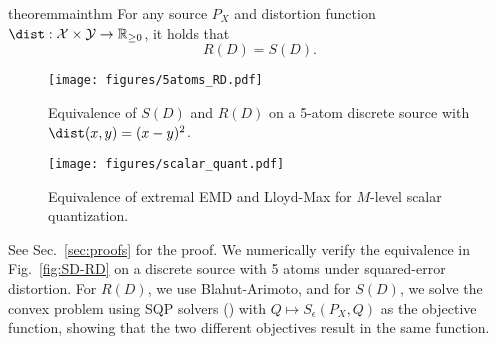 \documentclass{article} %
\begin{document}
	

        \begin{restatable}{theorem}{mainthm}%
            For any source $P_X$ and distortion function $\dist: \mathcal{X} \times \mathcal{Y} \rightarrow \mathbb{R}_{\geq 0}$, it holds that
            \begin{equation}
                R(D) = S(D).
            \end{equation}
        \end{restatable}

        

        \begin{figure*}[t]
            \centering
            \begin{minipage}{.48\textwidth}
                \centering
                \texttt{[image: figures/5atoms\_RD.pdf]}
                \caption{Equivalence of $S(D)$ and $R(D)$ on a 5-atom discrete source with $\dist(x,y)=(x-y)^2$. }
                \label{fig:SD-RD}
            \end{minipage}%
            \hfill
            \begin{minipage}{0.48\textwidth}
                \centering
                \texttt{[image: figures/scalar\_quant.pdf]}
                \caption{Equivalence of extremal EMD and Lloyd-Max for $M$-level scalar quantization.}
                \label{fig:SQ_EMD}
            \end{minipage}
        \end{figure*}

        See Sec.~\ref{sec:proofs} for the proof. We numerically verify the equivalence in Fig.~\ref{fig:SD-RD} on a discrete source with 5 atoms under squared-error distortion. For $R(D)$, we use Blahut-Arimoto, and for $S(D)$, we solve the convex problem using SQP solvers (\cite{SLSQP}) with $Q \mapsto S_{\epsilon}(P_X, Q)$ as the objective function, showing that the two different objectives result in the same function. 
\end{document}
